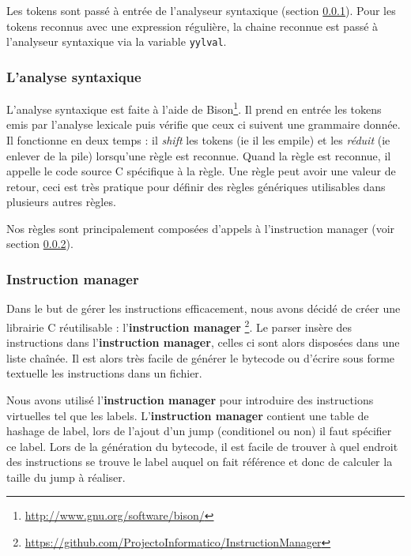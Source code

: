     Les tokens sont passé à entrée de l'analyseur syntaxique (section \ref{syntaxique}). Pour les tokens reconnus avec une expression régulière, la chaine reconnue est passé à l'analyseur syntaxique via la variable \texttt{yylval}. 
    
    \subsubsection{L'analyse syntaxique} \label{syntaxique}
    
    L'analyse syntaxique est faite à l'aide de Bison\footnote{\url{http://www.gnu.org/software/bison/}}. Il prend en entrée les tokens emis par l'analyse lexicale puis vérifie que ceux ci suivent une grammaire donnée. Il fonctionne en deux temps : il \textit{shift} les tokens (ie il les empile) et les \textit{réduit} (ie enlever de la pile) lorsqu'une règle est reconnue. Quand la règle est reconnue, il appelle le code source C spécifique à la règle. Une règle peut avoir une valeur de retour, ceci est très pratique pour définir des règles génériques utilisables dans plusieurs autres règles.
    
    Nos règles sont principalement composées d'appels à l'instruction manager (voir section \ref{instruction_manager}).
    
    \subsubsection{Instruction manager} \label{instruction_manager}

    Dans le but de gérer les instructions efficacement, nous avons décidé de créer une librairie C réutilisable : l'\textbf{instruction manager} \footnote{\url{https://github.com/ProjectoInformatico/InstructionManager}}. Le parser insère des instructions dans l'\textbf{instruction manager}, celles ci sont alors disposées dans une liste chaînée. Il est alors très facile de générer le bytecode ou d'écrire sous forme textuelle les instructions dans un fichier.
    
    Nous avons utilisé l'\textbf{instruction manager} pour introduire des instructions virtuelles tel que les labels. L'\textbf{instruction manager} contient une table de hashage de label, lors de l'ajout d'un jump (conditionel ou non) il faut spécifier ce label. Lors de la génération du bytecode, il est facile de trouver à quel endroit des instructions se trouve le label auquel on fait référence et donc de calculer la taille du jump à réaliser.

